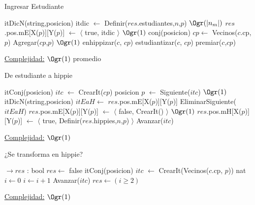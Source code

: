 \begin{Algoritmos}
\begin{algorithm}[H]
\caption{Ingresar Estudiante}
\begin{algorithmic}[1]
	\State itDicN(string,posicion) itdic $\gets$ Definir($res$.estudiantes,$n$,$p$) \Comment $\Ogr(|n_m|)$
	\State $res$.pos.mE[X($p$)][Y($p$)] $\gets$ $\langle$ true, itdic $\rangle$ \Comment $\Ogr(1)$
	\State conj(posicion) $cp \gets$ Vecinos($c$.cp, $p$)
	\State Agregar($cp$,$p$) \Comment $\Ogr(1)$
	\State enhippizar($c$, $cp$)
	\State estudiantizar($c$, $cp$)
	\State premiar($c$,$cp$)
\EndProcedure
\end{algorithmic}
\underline{Complejidad:} $\Ogr(1)$ promedio
\end{algorithm}




\begin{algorithm}[H]
\caption{De estudiante a hippie}
\begin{algorithmic}[1]
	\State itConj(posicion) $itc$ $\gets$ CrearIt($cp$)
	\State posicion $p$ $\gets$ Siguiente($itc$)
	 \Comment $\Ogr(1)$
		\State itDicN(string,posicion) $itEaH \gets$ $res$.pos.mE[X($p$)][Y($p$)]
		\State EliminarSiguiente($itEaH$)
		\State $res$.pos.mE[X($p$)][Y($p$)] $\gets$ $\langle$ false, CrearIt() $\rangle$ \Comment $\Ogr(1)$
		\State $res$.pos.mH[X($p$)][Y($p$)] $\gets$ $\langle$ true, 	Definir($res$.hippies,$n$,$p$) $\rangle$
	\EndIf
		\State Avanzar($itc$)
	\EndWhile
	\EndProcedure
\end{algorithmic}
\underline{Complejidad:} $\Ogr(1)$
\end{algorithm}


\begin{algorithm}[H]
\caption{¿Se transforma en hippie?}
\begin{algorithmic}[1]
	 $\to res$ : bool
	\State $res \gets$ false
	\State itConj(posicion) $itc$ $\gets$ CrearIt(Vecinos($c$.cp, $p$))
	\State nat $i \gets 0$
			\State $i \gets i+1$
		\EndIf
		\State Avanzar($itc$)
	\EndWhile
	$res \gets (i \geq 2)$
	\EndProcedure
\end{algorithmic}
\underline{Complejidad:} $\Ogr(1)$
\end{algorithm}



\end{Algoritmos}
